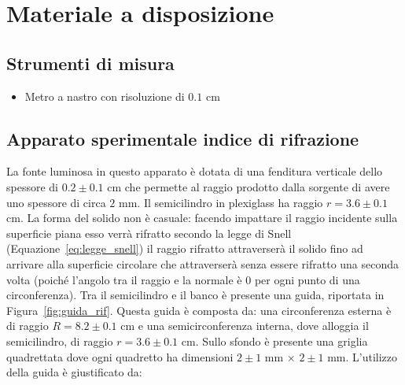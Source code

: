 \documentclass[a4paper,12pt]{article}
\begin{document}
\section{Materiale a disposizione}

\subsection{Strumenti di misura}

\begin{itemize}
    \item Metro a nastro con risoluzione di $0.1$ cm
\end{itemize}

\subsection{Apparato sperimentale indice di rifrazione}\label{sec:apparato_snell}


La fonte luminosa in questo apparato è dotata di una fenditura verticale dello spessore di $0.2 \pm 0.1$ cm che permette al raggio prodotto dalla sorgente di avere uno spessore di circa $2$ mm.
Il semicilindro in plexiglass ha raggio $r = 3.6 \pm 0.1$ cm. La forma del solido non è casuale: facendo impattare il raggio incidente sulla superficie piana esso verrà rifratto secondo la legge di Snell (Equazione~\ref{eq:legge_snell}) il raggio rifratto attraverserà il solido fino ad arrivare alla superficie circolare che attraverserà senza essere rifratto una seconda volta (poiché l'angolo tra il raggio e la normale è 0 per ogni punto di una circonferenza). 
Tra il semicilindro e il banco è presente una guida, riportata in Figura~\ref{fig:guida_rif}. Questa guida è composta da: una circonferenza esterna è di raggio $R = 8.2 \pm 0.1$ cm e una semicirconferenza interna, dove alloggia il semicilindro, di raggio $r = 3.6 \pm 0.1$ cm. Sullo sfondo è presente una griglia quadrettata dove ogni quadretto ha dimensioni $2 \pm 1$ mm $\times$ $2 \pm 1$ mm. L'utilizzo della guida è giustificato da:
\end{document}
